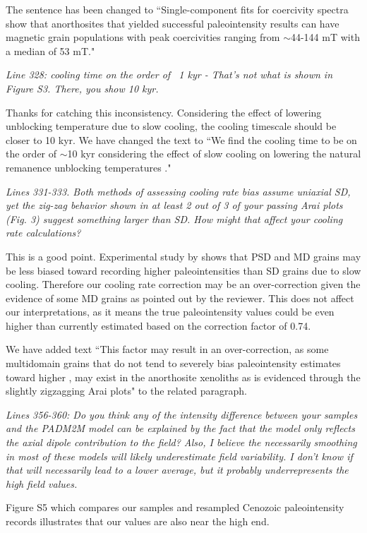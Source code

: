 \documentclass[11pt, letterpaper]{article}
\begin{document}
\begin{flushleft}
The sentence has been changed to ``Single-component fits for coercivity spectra \cite{Maxbauer2016a} show that anorthosites that yielded successful paleointensity results can have magnetic grain populations with peak coercivities ranging from $\sim$44-144 mT with a median of 53 mT."

\textit{Line 328: cooling time on the order of ~1 kyr - That's not what is shown in Figure S3. There, you show 10 kyr.}

Thanks for catching this inconsistency. Considering the effect of lowering unblocking temperature due to slow cooling, the cooling timescale should be closer to 10 kyr. We have changed the text to ``We find the cooling time to be on the order of $\sim$10 kyr considering the effect of slow cooling on lowering the natural remanence unblocking temperatures \cite{Halgedahl1980a}."

\textit{Lines 331-333. Both methods of assessing cooling rate bias assume uniaxial SD, yet the zig-zag behavior shown in at least 2 out of 3 of your passing Arai plots (Fig. 3) suggest something larger than SD. How might that affect your cooling rate calculations?}

This is a good point. Experimental study by \cite{Biggin2013a} shows that PSD and MD grains may be less biased toward recording higher paleointensities than SD grains due to slow cooling. Therefore our cooling rate correction may be an over-correction given the evidence of some MD grains as pointed out by the reviewer. This does not affect our interpretations, as it means the true paleointensity values could be even higher than currently estimated based on the correction factor of 0.74. 

We have added text ``This factor may result in an over-correction, as some multidomain grains that do not tend to severely bias paleointensity estimates toward higher \cite{Biggin2013a}, may exist in the anorthosite xenoliths as is evidenced through the slightly zigzagging Arai plots" to the related paragraph. 

\textit{Lines 356-360: Do you think any of the intensity difference between your samples and the PADM2M model can be explained by the fact that the model only reflects the axial dipole contribution to the field? Also, I believe the necessarily smoothing in most of these models will likely underestimate field variability. I don't know if that will necessarily lead to a lower average, but it probably underrepresents the high field values.}

Figure S5 which compares our samples and resampled Cenozoic paleointensity records illustrates that our values are also near the high end. 


\end{flushleft}
\end{document}
